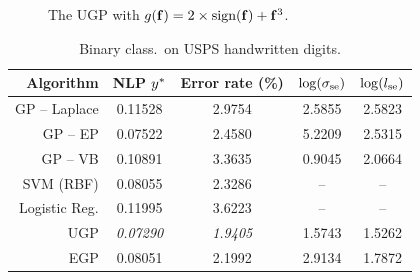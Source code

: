 \documentclass{beamer}
\begin{document}
\begin{frame}
\begin{columns}
\begin{column}{0.55\linewidth}
\begin{figure}
    \caption{The UGP with $g\!\left({{\mathbf{f}}}\right) =
        2\times\text{sign}\!\left({\mathbf{f}}\right) + \mathbf{f}^3$.}

\end{figure}

\vspace{-1cm}

\begin{table}[tb]
    \centering
    \caption[]{Binary class.\ on USPS handwritten digits.}
    \tiny
    \vspace{-3mm}
    \begin{tabular}{r| c c c c}
    Algorithm & NLP $y^{*}$ & Error rate (\%) 
        & $\log\!\left({\sigma_\text{se}}\right)$ & $\log\!\left({l_\text{se}}\right)$ \\
    \toprule
    GP -- Laplace & 0.11528 & 2.9754 & 2.5855 & 2.5823 \\
    GP -- EP & 0.07522 & 2.4580 & 5.2209 & 2.5315 \\
    GP -- VB & 0.10891 & 3.3635 & 0.9045 & 2.0664 \\ 
    SVM (RBF) & 0.08055 & 2.3286 & -- & -- \\
    Logistic Reg. & 0.11995 & 3.6223 & -- & -- \\
    \midrule
    UGP & \emph{0.07290} & \emph{1.9405} & 1.5743 & 1.5262 \\
    EGP & 0.08051 & 2.1992 & 2.9134 & 1.7872 \\
    \bottomrule
    \end{tabular}
    \label{tab:class}
\end{table}

\end{column}


\end{columns}

\end{frame}
\end{document}

